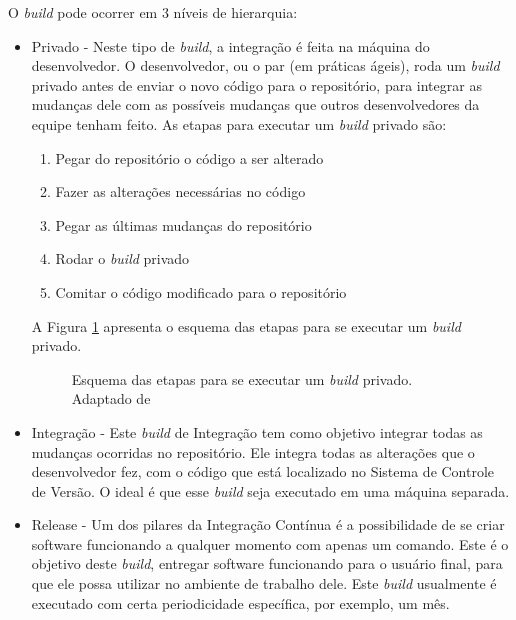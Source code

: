 O \textit{build} pode ocorrer em 3 níveis de hierarquia:

\begin{itemize}
    \item{Privado}
    - Neste tipo de \textit{build}, a integração é feita na máquina do desenvolvedor. O desenvolvedor, ou o par (em práticas ágeis), roda um \textit{build} privado antes de enviar o novo código para o repositório, para integrar as mudanças dele com as possíveis mudanças que outros desenvolvedores da equipe tenham feito. As etapas para executar um \textit{build} privado são:
    \begin{enumerate}
        \item{Pegar do repositório o código a ser alterado}
        \item{Fazer as alterações necessárias no código}
        \item{Pegar as últimas mudanças do repositório}
        \item{Rodar o \textit{build} privado}
        \item{Comitar o código modificado para o repositório}
    \end{enumerate}

A Figura \ref{build_privado} apresenta o esquema das etapas para se executar um \textit{build} privado.

\begin{figure}[ht]
    \centering
    \caption{Esquema das etapas para se executar um \textit{build} privado. Adaptado de \cite{DUVALL}}
    \label{build_privado}
\end{figure}

    \item{Integração}
    - Este \textit{build} de Integração tem como objetivo integrar todas as mudanças ocorridas no repositório. Ele integra todas as alterações que o desenvolvedor fez, com o código que está localizado no Sistema de Controle de Versão. O ideal é que esse \textit{build} seja executado em uma máquina separada.

    \item{Release}
    - Um dos pilares da Integração Contínua é a possibilidade de se criar software funcionando a qualquer momento com apenas um comando. Este é o objetivo deste \textit{build}, entregar software funcionando para o usuário final, para que ele possa utilizar no ambiente de trabalho dele. Este \textit{build} usualmente é executado com certa periodicidade específica, por exemplo, um mês.
\end{itemize}


